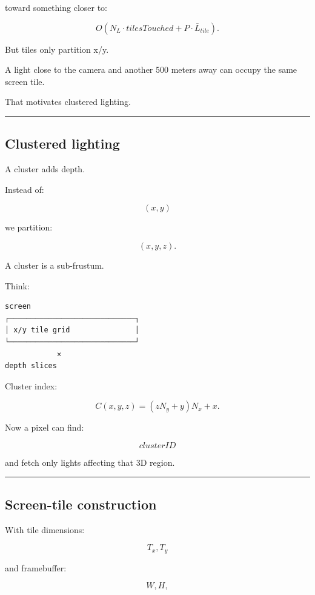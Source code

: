 toward something closer to:

\[
O(
N_L\cdot tilesTouched
+
P\cdot \bar L_{tile}
).
\]

But tiles only partition x/y.

A light close to the camera and another 500 meters away can occupy the same screen tile.

That motivates clustered lighting.

\begin{center}\rule{0.5\linewidth}{0.5pt}\end{center}

\subsection{Clustered lighting}\label{04-visual-computing-ii-ch040-clustered-lighting}

A cluster adds depth.

Instead of:

\[
(x,y)
\]

we partition:

\[
(x,y,z).
\]

A cluster is a sub-frustum.

Think:

\begin{verbatim}
screen
┌─────────────────────────────┐
│ x/y tile grid               │
└─────────────────────────────┘
            ×
depth slices
\end{verbatim}

Cluster index:

\[
\boxed{
C(x,y,z)
=
(zN_y+y)N_x+x.
}
\]

Now a pixel can find:

\[
clusterID
\]

and fetch only lights affecting that 3D region.

\begin{center}\rule{0.5\linewidth}{0.5pt}\end{center}

\subsection{Screen-tile construction}\label{04-visual-computing-ii-ch040-screen-tile-construction}

With tile dimensions:

\[
T_x,T_y
\]

and framebuffer:

\[
W,H,
\]

